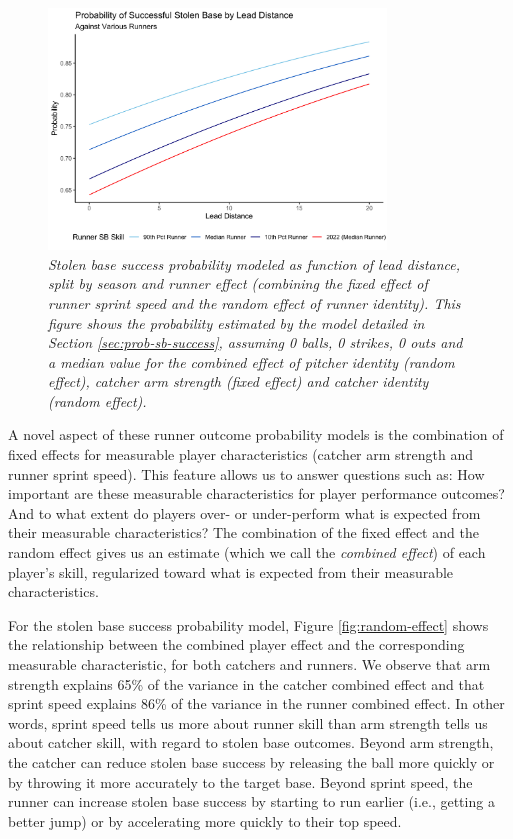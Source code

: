\documentclass{article}
\begin{document}
      \begin{figure}
        \centering
        \includegraphics[width = 0.8\textwidth]{../../output/figures/prob_sb_success.png}
        \caption{
          \it Stolen base success probability modeled as function of lead distance, split by season and runner effect (combining the fixed effect of runner sprint speed and the random effect of runner identity). This figure shows the probability estimated by the model detailed in Section \ref{sec:prob-sb-success}, assuming 0 balls, 0 strikes, 0 outs and a median value for the combined effect of pitcher identity (random effect), catcher arm strength (fixed effect) and catcher identity (random effect).
        }
        \label{fig:prob-sb-success}
      \end{figure}

      A novel aspect of these runner outcome probability models is the combination of fixed effects for measurable player characteristics (catcher arm strength and runner sprint speed). This feature allows us to answer questions such as: How important are these measurable characteristics for player performance outcomes? And to what extent do players over- or under-perform what is expected from their measurable characteristics? The combination of the fixed effect and the random effect gives us an estimate (which we call the {\it combined effect}) of each player's skill, regularized toward what is expected from their measurable characteristics.

      For the stolen base success probability model, Figure \ref{fig:random-effect} shows the relationship between the combined player effect and the corresponding measurable characteristic, for both catchers and runners. We observe that arm strength explains 65\% of the variance in the catcher combined effect and that sprint speed explains 86\% of the variance in the runner combined effect. In other words, sprint speed tells us more about runner skill than arm strength tells us about catcher skill, with regard to stolen base outcomes. Beyond arm strength, the catcher can reduce stolen base success by releasing the ball more quickly or by throwing it more accurately to the target base. Beyond sprint speed, the runner can increase stolen base success by starting to run earlier (i.e., getting a better jump) or by accelerating more quickly to their top speed.
      
\end{document}

